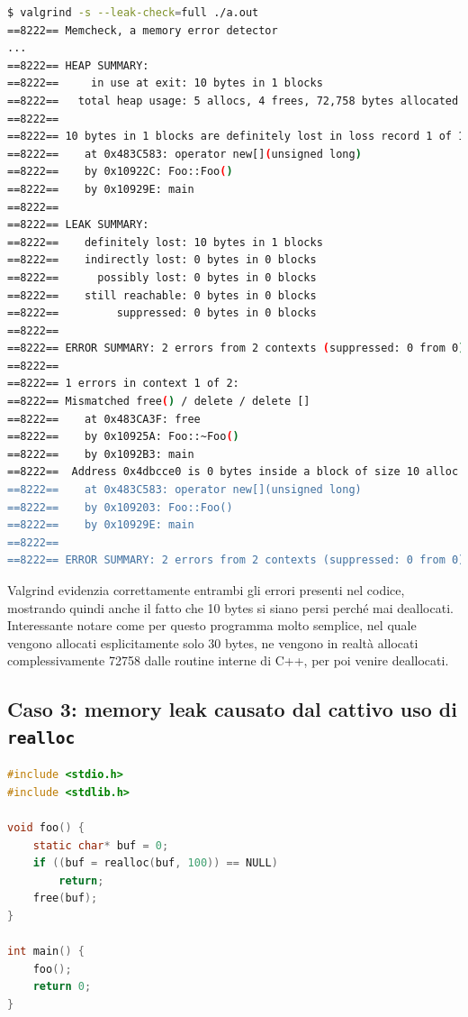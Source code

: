 \documentclass{article}
\begin{document}
\begin{lstlisting}[language=bash]
$ valgrind -s --leak-check=full ./a.out 
==8222== Memcheck, a memory error detector
...
==8222== HEAP SUMMARY:
==8222==     in use at exit: 10 bytes in 1 blocks
==8222==   total heap usage: 5 allocs, 4 frees, 72,758 bytes allocated
==8222== 
==8222== 10 bytes in 1 blocks are definitely lost in loss record 1 of 1
==8222==    at 0x483C583: operator new[](unsigned long) 
==8222==    by 0x10922C: Foo::Foo() 
==8222==    by 0x10929E: main 
==8222== 
==8222== LEAK SUMMARY:
==8222==    definitely lost: 10 bytes in 1 blocks
==8222==    indirectly lost: 0 bytes in 0 blocks
==8222==      possibly lost: 0 bytes in 0 blocks
==8222==    still reachable: 0 bytes in 0 blocks
==8222==         suppressed: 0 bytes in 0 blocks
==8222== 
==8222== ERROR SUMMARY: 2 errors from 2 contexts (suppressed: 0 from 0)
==8222== 
==8222== 1 errors in context 1 of 2:
==8222== Mismatched free() / delete / delete []
==8222==    at 0x483CA3F: free 
==8222==    by 0x10925A: Foo::~Foo() 
==8222==    by 0x1092B3: main 
==8222==  Address 0x4dbcce0 is 0 bytes inside a block of size 10 alloc'd
==8222==    at 0x483C583: operator new[](unsigned long) 
==8222==    by 0x109203: Foo::Foo() 
==8222==    by 0x10929E: main 
==8222== 
==8222== ERROR SUMMARY: 2 errors from 2 contexts (suppressed: 0 from 0)
\end{lstlisting}

Valgrind evidenzia correttamente entrambi gli errori presenti nel codice,
mostrando quindi anche il fatto che 10 bytes si siano persi perché mai
deallocati. \\
Interessante notare come per questo programma molto semplice, nel quale vengono
allocati esplicitamente solo 30 bytes, ne vengono in realtà allocati
complessivamente 72758 dalle routine interne di C++, per poi venire deallocati. 

\newpage
\subsection{Caso 3: memory leak causato dal cattivo uso di \texttt{realloc}}
\label{sec:caso3}

\begin{lstlisting}[language=c]
#include <stdio.h>
#include <stdlib.h>

void foo() {
    static char* buf = 0;
    if ((buf = realloc(buf, 100)) == NULL)
        return;
    free(buf);
}

int main() {
    foo();
    return 0;
}
\end{lstlisting}
\end{document}
